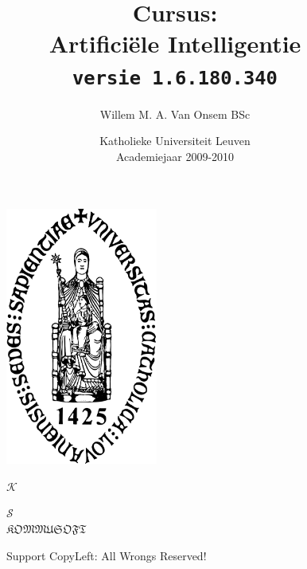\documentclass[titlepage,a4paper]{article}
\title{Cursus:\\Artifici\"ele Intelligentie\\\texttt{\small versie 1.6.180.340}}
\author{Willem M. A. Van Onsem BSc}
\date{Katholieke Universiteit Leuven\\Academiejaar 2009-2010}
\begin{document}
\begin{titlepage}
\begin{figure}[t]
\centering
\includegraphics[width=5cm]{sedesVcrop.pdf}
\end{figure}
\begin{figure}[b]
\centering
\begin{tiny}
$\mathcal{K}$
\end{tiny}
\begin{Huge}
\textcopyleft
\end{Huge}
\begin{tiny}
$\mathcal{S}$\\
$\mathfrak{KOMMUSOFT}$
\end{tiny}
\caption{Support CopyLeft: All Wrongs Reserved!}
\end{figure}
\maketitle
\end{titlepage}
\tableofcontents
\newpage
\end{document}
